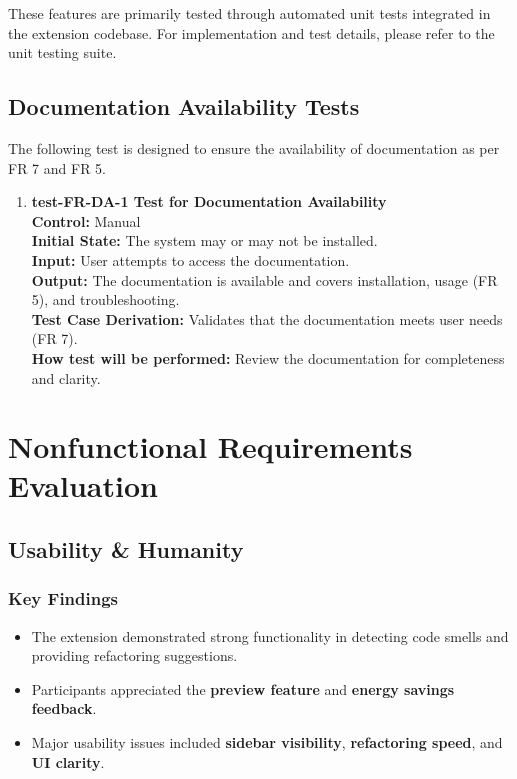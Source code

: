 \documentclass[12pt, titlepage]{article}
\begin{document}
These features are primarily tested through automated unit tests integrated in the extension codebase. For implementation and test details, please refer to the unit testing suite.

\subsection{Documentation Availability Tests}

The following test is designed to ensure the availability of documentation as per FR 7 and FR 5.

\begin{enumerate}
  \item \textbf{test-FR-DA-1 Test for Documentation Availability} \\[2mm]
    \textbf{Control:} Manual \\
    \textbf{Initial State:} The system may or may not be installed. \\
    \textbf{Input:} User attempts to access the documentation. \\
    \textbf{Output:} The documentation is available and covers installation, usage (FR 5), and troubleshooting. \\
    \textbf{Test Case Derivation:} Validates that the documentation meets user needs (FR 7). \\
    \textbf{How test will be performed:} Review the documentation for completeness and clarity.
\end{enumerate}

\section{Nonfunctional Requirements Evaluation}

\subsection{Usability \& Humanity}

\subsubsection{Key Findings}
\begin{itemize}
  \item The extension demonstrated strong functionality in detecting
    code smells and providing refactoring suggestions.
  \item Participants appreciated the \textbf{preview feature} and
    \textbf{energy savings feedback}.
  \item Major usability issues included \textbf{sidebar visibility},
    \textbf{refactoring speed}, and \textbf{UI clarity}.
\end{itemize}
\end{document}
